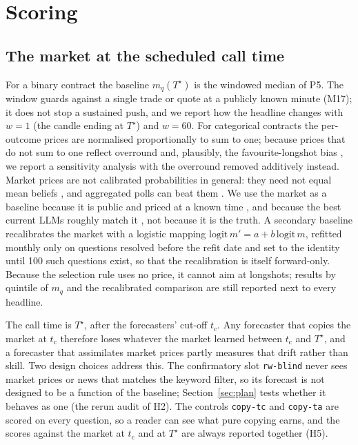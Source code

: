 \documentclass[11pt]{article}
\newcommand{\Ts}{T^{\star}}
\newcommand{\tc}{t_{\mathrm{c}}}
\begin{document}
\section{Scoring}
\label{sec:scoring}

\subsection{The market at the scheduled call time}

For a binary contract the baseline $m_q(\Ts)$ is the windowed median of P5. The window guards against a single trade or quote at a publicly known minute (M17); it does not stop a sustained push, and we report how the headline changes with $w = 1$ (the candle ending at $\Ts$) and $w = 60$. For categorical contracts the per-outcome prices are normalised proportionally to sum to one; because prices that do not sum to one reflect overround and, plausibly, the favourite-longshot bias \citep{snowberg2010}, we report a sensitivity analysis with the overround removed additively instead. Market prices are not calibrated probabilities in general: they need not equal mean beliefs \citep{manski2006}, and aggregated polls can beat them \citep{atanasov2017}. We use the market as a baseline because it is public and priced at a known time \citep{wolfers2004}, and because the best current LLMs roughly match it \citep{yang2025prophet}, not because it is the truth. A secondary baseline recalibrates the market with a logistic mapping $\mathrm{logit}\, m' = a + b\, \mathrm{logit}\, m$, refitted monthly only on questions resolved before the refit date and set to the identity until 100 such questions exist, so that the recalibration is itself forward-only. Because the selection rule uses no price, it cannot aim at longshots; results by quintile of $m_q$ and the recalibrated comparison are still reported next to every headline.

The call time is $\Ts$, after the forecasters' cut-off $\tc$. Any forecaster that copies the market at $\tc$ therefore loses whatever the market learned between $\tc$ and $\Ts$, and a forecaster that assimilates market prices partly measures that drift rather than skill. Two design choices address this. The confirmatory slot \texttt{rw-blind} never sees market prices or news that matches the keyword filter, so its forecast is not designed to be a function of the baseline; Section~\ref{sec:plan} tests whether it behaves as one (the rerun audit of H2). The controls \texttt{copy-tc} and \texttt{copy-ta} are scored on every question, so a reader can see what pure copying earns, and the scores against the market at $\tc$ and at $\Ts$ are always reported together (H5).
\end{document}
